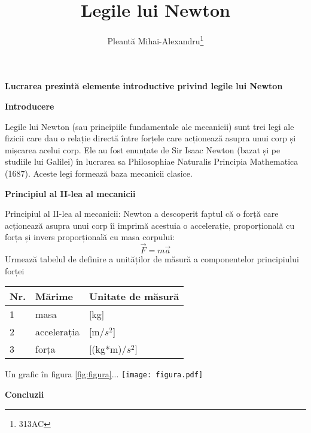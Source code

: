 \documentclass{slides}
\title{Legile lui Newton}
\author{Pleantă Mihai-Alexandru\footnote{313AC}}
\date{}
\begin{document}
\maketitle
\textbf{Lucrarea prezintă elemente introductive privind legile lui Newton}
%
\begin{center}
\textbf{Introducere}
\end{center}
Legile lui Newton (sau principiile fundamentale ale mecanicii) sunt trei legi ale fizicii care dau o relație directă între forțele care acționează asupra unui corp și mișcarea acelui corp. Ele au fost enunțate de Sir Isaac Newton (bazat și pe studiile lui Galilei) în lucrarea sa Philosophiae Naturalis Principia Mathematica (1687). Aceste legi formează baza mecanicii clasice.
\begin{center}
\textbf{Principiul al II-lea al mecanicii}
\end{center}
Principiul al II-lea al mecanicii: Newton a descoperit faptul că o forță care acționează asupra unui corp îi imprimă acestuia o accelerație, proporțională cu forța și invers proporțională cu masa corpului:
\begin{equation}
\vec{F}=m\vec{a}
\end{equation}
Urmează tabelul de definire a unităților de măsură a componentelor principiului forței
\centering
\begin{tabular}{lll}
\hline
Nr.&Mărime&Unitate de măsură\\\hline
1&masa&[kg]\\\hline
2&accelerația&[m/$s^2$]\\\hline
3&forța&[(kg*m)/$s^2$]
\end{tabular}
Un grafic în figura \ref{fig:figura}...
\centering
\texttt{[image: figura.pdf]}
\begin{center}
\textbf{Concluzii}
\end{center}
\end{document}
